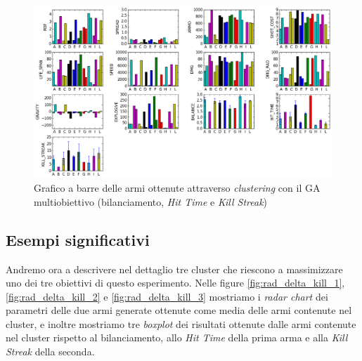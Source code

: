 \documentclass[12pt, italian]{toptesi}
\begin{document}
\begin{figure}[tp]
\centering
\includegraphics[width=1.2\textwidth, angle=90]{bar_delta_kill}
\caption{Grafico a barre delle armi ottenute attraverso \emph{clustering} con il GA multiobiettivo (bilanciamento, \emph{Hit Time} e \emph{Kill Streak})}
\label{fig:bar_delta_kill}
\end{figure}

\subsection{Esempi significativi}
Andremo ora a descrivere nel dettaglio tre cluster che riescono a massimizzare uno dei tre obiettivi di questo esperimento.
Nelle figure \ref{fig:rad_delta_kill_1}, \ref{fig:rad_delta_kill_2} e \ref{fig:rad_delta_kill_3} mostriamo i \emph{radar chart} dei parametri delle due armi generate ottenute come media delle armi contenute nel cluster, e inoltre mostriamo tre \emph{boxplot} dei risultati ottenute dalle armi contenute nel cluster rispetto al bilanciamento, allo \emph{Hit Time} della prima arma e alla \emph{Kill Streak} della seconda.
\end{document}
